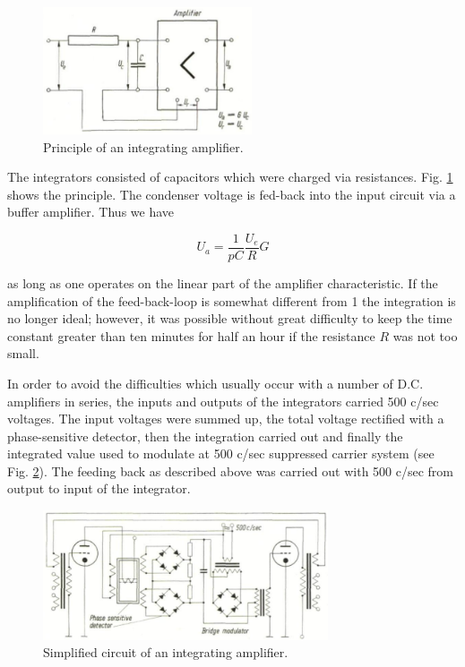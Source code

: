\documentclass[12pt, a4paper]{article}
\begin{document}
\begin{figure}[ht]
  \centering
  \includegraphics[width=0.55\textwidth]{figs/ctrl-14.png}
  \caption{Principle of an integrating amplifier.}
  \label{fig:14}
\end{figure}

The integrators consisted of capacitors which were charged via resistances. Fig. \ref{fig:14} shows the principle. The condenser voltage is fed-back into the input circuit via a buffer amplifier. Thus we have

\begin{equation}
  U_{a}=\frac{1}{pC}\frac{U_{e}}{R}G
\end{equation}

as long as one operates on the linear part of the amplifier characteristic. If the amplification of the feed-back-loop is somewhat different from 1 the integration is no longer ideal; however, it was possible without great difficulty to keep the time constant greater than ten minutes for half an hour if the resistance $R$ was not too small.

In order to avoid the difficulties which usually occur with a number of D.C. amplifiers in series, the inputs and outputs of the integrators carried 500 c/sec voltages. The input voltages were summed up, the total voltage rectified with a phase-sensitive detector, then the integration carried out and finally the integrated value used to modulate at 500 c/sec suppressed carrier system (see Fig. \ref{fig:15}). The feeding back as described above was carried out with 500 c/sec from output to input of the integrator.

\begin{figure}[ht]
  \centering
  \includegraphics[width=0.75\textwidth]{figs/ctrl-15.png}
  \caption{Simplified circuit of an integrating amplifier.}
  \label{fig:15}
\end{figure}
\end{document}
